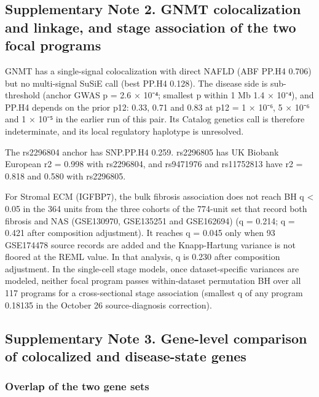 \subsection{Supplementary Note 2. GNMT colocalization and linkage, and stage association of the two focal programs}\label{supplementary-note-2.-gnmt-colocalization-and-linkage-and-stage-association-of-the-two-focal-programs}

GNMT has a single-signal colocalization with direct NAFLD (ABF PP.H4 0.706) but no multi-signal SuSiE call (best PP.H4 0.128). The disease side is sub-threshold (anchor GWAS p = 2.6 × 10⁻⁴; smallest p within 1 Mb 1.4 × 10⁻⁴), and PP.H4 depends on the prior p12: 0.33, 0.71 and 0.83 at p12 = 1 × 10⁻⁶, 5 × 10⁻⁶ and 1 × 10⁻⁵ in the earlier run of this pair. Its Catalog genetics call is therefore indeterminate, and its local regulatory haplotype is unresolved.

The rs2296804 anchor has SNP.PP.H4 0.259. rs2296805 has UK Biobank European r2 = 0.998 with rs2296804, and rs9471976 and rs11752813 have r2 = 0.818 and 0.580 with rs2296805.

For Stromal ECM (IGFBP7), the bulk fibrosis association does not reach BH q \textless{} 0.05 in the 364 units from the three cohorts of the 774-unit set that record both fibrosis and NAS (GSE130970, GSE135251 and GSE162694) (q = 0.214; q = 0.421 after composition adjustment). It reaches q = 0.045 only when 93 GSE174478 source records are added and the Knapp-Hartung variance is not floored at the REML value. In that analysis, q is 0.230 after composition adjustment. In the single-cell stage models, once dataset-specific variances are modeled, neither focal program passes within-dataset permutation BH over all 117 programs for a cross-sectional stage association (smallest q of any program 0.18135 in the October 26 source-diagnosis correction).

\subsection{Supplementary Note 3. Gene-level comparison of colocalized and disease-state genes}\label{supplementary-note-3.-gene-level-comparison-of-colocalized-and-disease-state-genes}

\subsubsection{Overlap of the two gene sets}\label{overlap-of-the-two-gene-sets}

